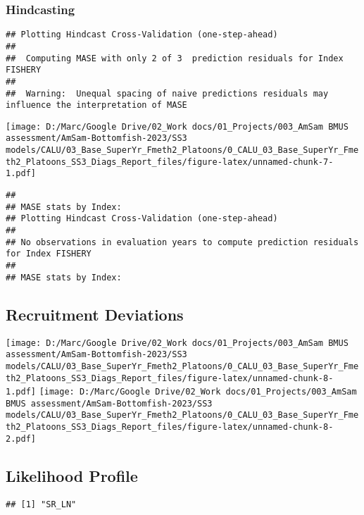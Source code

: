 \documentclass[
]{article}
\begin{document}
\hypertarget{hindcasting}{%
\subsubsection{Hindcasting}\label{hindcasting}}

\begin{verbatim}
## Plotting Hindcast Cross-Validation (one-step-ahead) 
## 
##  Computing MASE with only 2 of 3  prediction residuals for Index FISHERY 
## 
##  Warning:  Unequal spacing of naive predictions residuals may influence the interpretation of MASE
\end{verbatim}

\texttt{[image: D:/Marc/Google Drive/02\_Work docs/01\_Projects/003\_AmSam BMUS assessment/AmSam-Bottomfish-2023/SS3 models/CALU/03\_Base\_SuperYr\_Fmeth2\_Platoons/0\_CALU\_03\_Base\_SuperYr\_Fmeth2\_Platoons\_SS3\_Diags\_Report\_files/figure-latex/unnamed-chunk-7-1.pdf]}

\begin{verbatim}
## 
## MASE stats by Index:
## Plotting Hindcast Cross-Validation (one-step-ahead) 
## 
## No observations in evaluation years to compute prediction residuals for Index FISHERY 
## 
## MASE stats by Index:
\end{verbatim}

\hypertarget{recruitment-deviations}{%
\subsection{Recruitment Deviations}\label{recruitment-deviations}}

\texttt{[image: D:/Marc/Google Drive/02\_Work docs/01\_Projects/003\_AmSam BMUS assessment/AmSam-Bottomfish-2023/SS3 models/CALU/03\_Base\_SuperYr\_Fmeth2\_Platoons/0\_CALU\_03\_Base\_SuperYr\_Fmeth2\_Platoons\_SS3\_Diags\_Report\_files/figure-latex/unnamed-chunk-8-1.pdf]}
\texttt{[image: D:/Marc/Google Drive/02\_Work docs/01\_Projects/003\_AmSam BMUS assessment/AmSam-Bottomfish-2023/SS3 models/CALU/03\_Base\_SuperYr\_Fmeth2\_Platoons/0\_CALU\_03\_Base\_SuperYr\_Fmeth2\_Platoons\_SS3\_Diags\_Report\_files/figure-latex/unnamed-chunk-8-2.pdf]}

\hypertarget{likelihood-profile}{%
\subsection{Likelihood Profile}\label{likelihood-profile}}

\begin{verbatim}
## [1] "SR_LN"
\end{verbatim}
\end{document}
